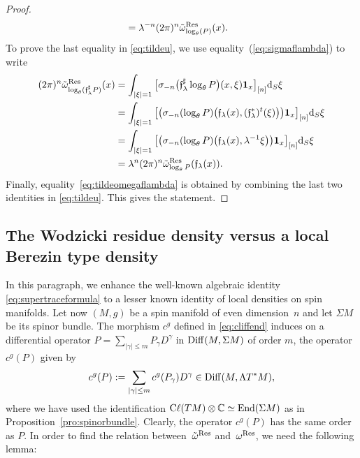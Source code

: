 \documentclass[10pt,a4paper]{amsart}
\numberwithin{equation}{section}
\theoremstyle{definition}
\newcommand{\Cl}{{\rm C}\ell}
\begin{document}
\begin{proof}
\begin{align*}
 &{}= \lambda^{-n} (2\pi)^n \tilde \omega^{\rm Res}_{ \log_\theta( P)}(x).
\end{align*}
To prove the last equality in \eqref{eq:tildeu}, we use equality~(\ref{eq:sigmaflambda}) to write
\begin{align*}
(2\pi)^n \tilde \omega^{\rm Res}_{\log_\theta (\mathfrak{f}_\lambda^\sharp P)}(x)&{}=\int_{\vert \xi\vert=1} \big[ \sigma_{-n}\bigl( { {\mathfrak f}}_{ \lambda}^\sharp \log_\theta P\bigr)(x,\xi) {\bf 1}_x \big]_{[n]} {\rm d}_S\xi\\
&{}=\int_{\vert \xi\vert=1} \big[ \bigl(\sigma_{ {-n}}({ \log_\theta P}) \bigl({ { {\mathfrak f}}_{ \lambda}(x)},({\mathfrak f}_{ \lambda}^*)^t (\xi) \bigr) \bigr) {\bf 1}_x \big]_{[n]} {\rm d}_S\xi \\
&{}=\int_{\vert \xi\vert=1} \big[ \bigl(\sigma_{ {-n}}({ \log_\theta P}) \bigl({ { {\mathfrak f}}_{ \lambda}(x)},\lambda^{-1}\xi \bigr) \bigr) {\bf 1}_x \big]_{[n]} {\rm d}_S\xi \\
&{}=\lambda^n (2\pi)^n \tilde \omega^{\rm Res}_{\log_\theta P}({\mathfrak f}_{ \lambda}(x)).
\end{align*}
Finally, equality~\eqref{eq:tildeomegaflambda} is obtained by combining the last two identities in \eqref{eq:tildeu}. This gives the statement.
\end{proof}

\subsection{The Wodzicki residue density versus a local Berezin type density } %
In this paragraph, we enhance the well-known algebraic identity \eqref{eq:supertraceformula} to a lesser known identity of local densities on spin manifolds. Let now $(M,g)$ be a spin manifold of even dimension~$n$ and let $\Sigma M$ be its spinor bundle. The morphism $c^g$ defined in \eqref{eq:cliffend} induces on a differential operator $P=\sum_{|\gamma|\leq m} P_\gamma D^\gamma$ in ${\rm Diff}(M,\Sigma M)$ of order $m$, the operator $c^g(P)$ given by
\begin{equation}\label{eq:cgp}
 c^g(P):=\sum_{|\gamma|\leq m} c^g ( P_\gamma) D^\gamma
\in {\rm Diff}(M, \Lambda T^*M),
\end{equation}
where we have used the identification $\Cl(TM)\otimes\mathbb{C}\simeq \operatorname{End}(\Sigma M)$ as in Proposition~\ref{pro:spinorbundle}. Clearly, the operator $c^g(P)$ has the same order as $P$. In order to find the relation between~$\tilde\omega^{\rm Res}$ and~$\omega^{\rm Res}$, we need the following lemma:
\end{document}
